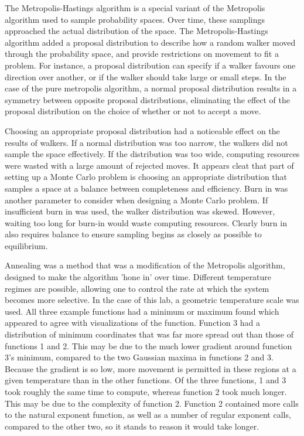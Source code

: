 \documentclass[twocolumn]{article}
\begin{document}
The Metropolis-Hastings algorithm is a special variant of the Metropolis algorithm used to sample probability spaces. Over time, these samplings approached the actual distribution of the space. The Metropolis-Hastings algorithm added a proposal distribution to describe how a random walker moved through the probability space, and provide restrictions on movement to fit a problem. For instance, a proposal distribution can specify if a walker favours one direction over another, or if the walker should take large or small steps. In the case of the pure metropolis algorithm, a normal proposal distribution results in a symmetry between opposite proposal distributions, eliminating the effect of the proposal distribution on the choice of whether or not to accept a move. 

Choosing an appropriate proposal distribution had a noticeable effect on the results of walkers. If a normal distribution was too narrow, the walkers did not sample the space effectively. If the distribution was too wide, computing resources were wasted with a large amount of rejected moves. It appears cleat that part of setting up a Monte Carlo problem is choosing an appropriate distribution that samples a space at a balance between completeness and efficiency. Burn in was another parameter to consider when designing a Monte Carlo problem. If insufficient burn in was used, the walker distribution was skewed. However, waiting too long for burn-in would waste computing resources. Clearly burn in also requires balance to ensure sampling begins as closely as possible to equilibrium.

Annealing was a method that was a modification of the Metropolis algorithm, designed to make the algorithm 'hone in' over  time. Different temperature regimes are possible, allowing one to control the rate at which the system becomes more selective. In the case of this lab, a geometric temperature scale was used. All three example functions had a minimum or maximum found which appeared to agree with visualizations of the function. Function 3 had a distribution of minimum coordinates that was far more spread out than those of functions 1 and 2. This may be due to the much lower gradient around function 3's minimum, compared to the two Gaussian maxima in functions 2 and 3. Because the gradient is so low, more movement is permitted in these regions at a given temperature than in the other functions. Of the three functions, 1 and 3 took roughly the same time to compute, whereas function 2 took much longer. This may be due to the complexity of function 2. Function 2 contained more calls to the natural exponent function, as well as a number of regular exponent calls, compared to the other two, so it stands to reason it would take longer.
 
\end{document}
